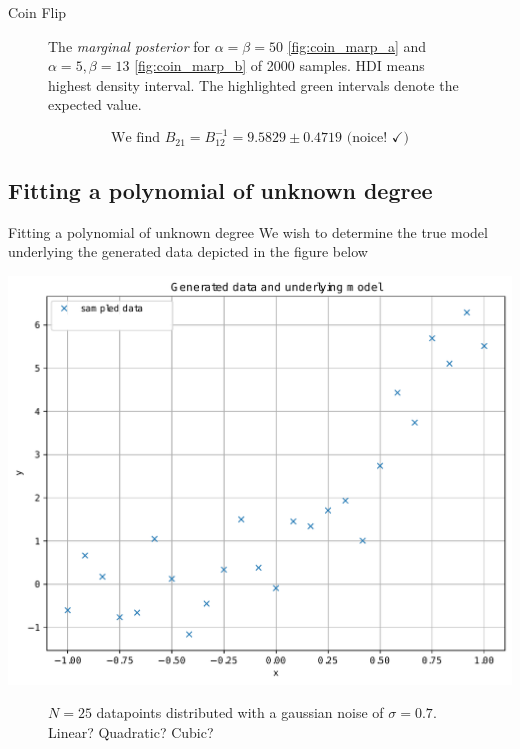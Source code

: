\documentclass[11pt,aspectratio=1610,dvipsnames]{beamer}
\begin{document}
\begin{frame}{Coin Flip}
\begin{figure}[htbp]
\begin{subfigure}{.49\linewidth}
			\subcaption{}\label{fig:coin_marp_b}
		\end{subfigure}
		\caption{The \emph{marginal posterior} for $\alpha=\beta=50$ \eqref{fig:coin_marp_a} and $\alpha=5, \beta=13$ \eqref{fig:coin_marp_b} of 2000 samples. HDI means highest density interval. The highlighted green intervals denote the expected value.}\label{fig:coin_marp}
	\end{figure}
 $$\text{We find }B_{21}=B_{12}^{-1}=9.5829\pm0.4719  \text{ (noice! } \checkmark)$$
\end{frame}
\subsection{Fitting a polynomial of unknown degree}
\begin{frame}{Fitting a polynomial of unknown degree}
	We wish to determine the true model underlying the generated data depicted in the figure below

		\centering
		\begin{minipage}{.7\linewidth}
			\includegraphics[width=.9\linewidth]{data_regression_line_sigma_07a_data.pdf}
		\end{minipage}
		\begin{minipage}{.25\linewidth}
				\begin{figure}
						\caption{$N=25$ datapoints distributed with a gaussian noise of $\sigma=0.7$. Linear? Quadratic? Cubic?}
				\end{figure}
		\end{minipage}

	
	
\end{frame}
\end{document}

